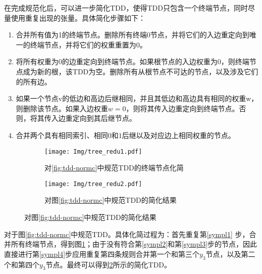 在完成规范化后，可以进一步简化TDD，使得TDD只包含一个终端节点，同时尽量使用重复出现的张量。具体简化步骤如下：
\begin{enumerate}
    \item 	合并所有值为1的终端节点。删除所有终端$0$节点，并将它们的入边重定向到唯一的终端节点，并将它们的权重重置为$0$。\label{sympl1}
	\item 将所有权重为$0$的边重定向到终端节点。如果根节点的入边权重为$0$，则终端节点成为新的根，该TDD为空。删除所有从根节点不可达的节点，以及涉及它们的所有边。\label{sympl2}
	\item 如果一个节点v的低边和高边后继相同，并且其低边和高边具有相同的权重w，则删除该节点。如果入边权重$w=0$，则将其传入边重定向到终端节点。否则，将其传入边重定向到其后继节点。\label{sympl3}
	\item 合并两个具有相同索引、相同$0$和$1$后继以及对应边上相同权重的节点。\label{sympl4}
\end{enumerate}

\begin{figure}[!htbp]
    \centering
    \begin{subfigure}[b]{0.4\textwidth}
        \centering
        \texttt{[image: Img/tree\_redu1.pdf]}
        \caption{对\ref{fig:tdd-normc}中规范TDD的终端节点化简}
        \label{fig:tdd-redu1}
    \end{subfigure}
    \begin{subfigure}[b]{0.4\textwidth}
        \centering
        \texttt{[image: Img/tree\_redu2.pdf]}
        \caption{对图\ref{fig:tdd-normc}中规范TDD的简化结果}
        \label{fig:tdd-redu2}
    \end{subfigure}
    \label{fig:tdd-redu}
\end{figure}

对于图\ref{fig:tdd-normc}中规范TDD。具体化简过程为：首先重复第\ref{sympl1} 步，合并所有终端节点，得到图\ref{fig:tdd-redu1}；由于没有符合第\ref{sympl2}和第\ref{sympl3}步的节点，因此直接进行第\ref{sympl4}步应用重复第四条规则合并第一个和第三个$y_3$节点，以及第二个和第四个$y_3$节点。最终可以得到\ref{fig:tdd-redu2}所示的简化TDD。

